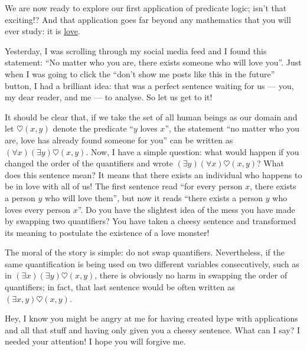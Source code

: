 \begin{para}
We are now ready to explore our first application of predicate logic; isn't that exciting!?
And that application goes far beyond any mathematics that you will ever study: it is \href{https://www.youtube.com/watch?v=-mLpe7KUg9U}{love}.

Yesterday, I was scrolling through my social media feed and I found this statement: ``No matter who you are, there exists someone who will love you''.
Just when I was going to click the ``don't show me posts like this in the future'' button, I had a brilliant idea: that was a perfect sentence waiting for us --- you, my dear reader, and me --- to analyse. So let us get to it!

It should be clear that, if we take the set of all human beings as our domain and let $\heartsuit(x,y)$ denote the predicate ``$y$ loves $x$'', the statement ``no matter who you are, love has already found someone for you'' can be written as $(\forall x)(\exists y) \heartsuit(x,y)$.
Now, I have a simple question: what would happen if you changed the order of the quantifiers and wrote $(\exists y)(\forall x)\heartsuit(x,y)$?
What does this sentence mean?
It means that there exists an individual who happens to be in love with all of us!
The first sentence read ``for every person $x$, there exists a person $y$ who will love them'', but now it reads ``there exists a person $y$ who loves every person $x$''.
Do you have the slightest idea of the mess you have made by swapping two quantifiers? You have taken a cheesy sentence and transformed its meaning to postulate the existence of a love monster!

The moral of the story is simple: do not swap quantifiers.
Nevertheless, if the same quantification is being used on two different variables consecutively, such as in $(\exists x)(\exists y)\heartsuit(x,y)$, there is obviously no harm in swapping the order of quantifiers; in fact, that last sentence would be often written as $(\exists x,y)\heartsuit(x,y)$.

Hey, I know you might be angry at me for having created hype with applications and all that stuff and having only given you a cheesy sentence. What can I say? I needed your attention! I hope you will forgive me.
\end{para}


